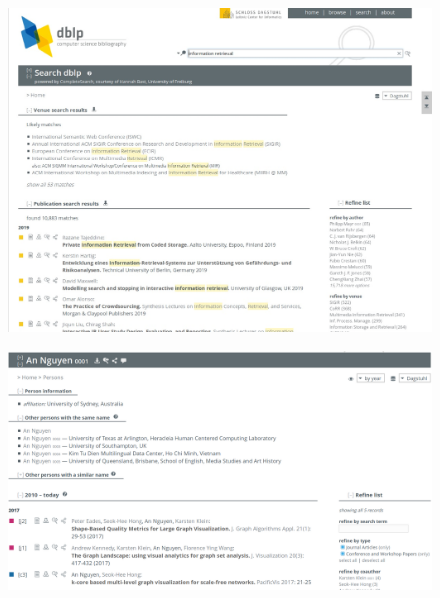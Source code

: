 \documentclass[xcolor={svgnames}]{beamer}
\makeatletter
\newcommand*{\currentname}{\@currentlabelname}
\makeatother
\begin{document}
\begin{frame}{\currentname}\linespread{1.5}
    \begin{figure}
      \begin{center}
        \includegraphics[width=\textwidth,height=0.8\textheight,keepaspectratio]{img/dblp_search.eps}
      \end{center}
    \end{figure}
\end{frame}

\begin{frame}{\currentname}\linespread{1.5}
    \begin{figure}
      \begin{center}
        \includegraphics[width=\textwidth,height=0.8\textheight,keepaspectratio]{img/dblp_author_entry.png}
      \end{center}
    \end{figure}
\end{frame}
\end{document}
